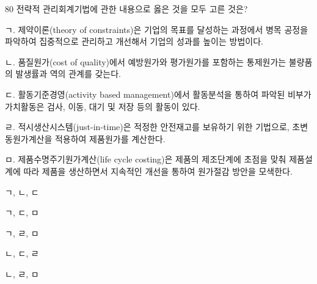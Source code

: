 \begin{question}{80}
전략적 관리회계기법에 관한 내용으로 옳은 것을 모두 고른 것은?
\begin{framedtext}
ㄱ. 제약이론(theory of constraints)은 기업의 목표를 달성하는 과정에서 병목 공정을 파악하여 집중적으로 관리하고 개선해서 기업의 성과를 높이는 방법이다. \par
ㄴ. 품질원가(cost of quality)에서 예방원가와 평가원가를 포함하는 통제원가는 불량품의 발생률과 역의 관계를 갖는다. \par
ㄷ. 활동기준경영(activity based management)에서 활동분석을 통하여 파악된 비부가가치활동은 검사, 이동, 대기 및 저장 등의 활동이 있다. \par
ㄹ. 적시생산시스템(just-in-time)은 적정한 안전재고를 보유하기 위한 기법으로, 초변동원가계산을 적용하여 제품원가를 계산한다. \par
ㅁ. 제품수명주기원가계산(life cycle costing)은 제품의 제조단계에 초점을 맞춰 제품설계에 따라 제품을 생산하면서 지속적인 개선을 통하여 원가절감 방안을 모색한다.
\end{framedtext}
\begin{choices}
  \item ㄱ, ㄴ, ㄷ
  \item ㄱ, ㄷ, ㅁ
  \item ㄱ, ㄹ, ㅁ
  \item ㄴ, ㄷ, ㄹ
  \item ㄴ, ㄹ, ㅁ
\end{choices}
\end{question}
